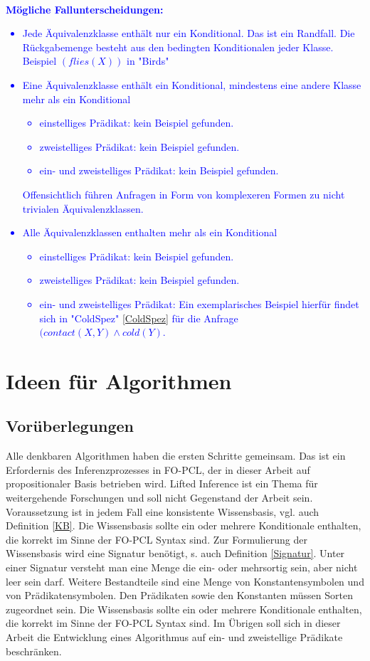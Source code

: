 \documentclass[a4paper, 11pt]{book}
\begin{document}
\textcolor{blue}{
	\\
\textbf{Mögliche Fallunterscheidungen:}\label{Fallunterscheidung Formel MehrAequi}
	\begin{itemize}
		\item Jede Äquivalenzklasse enthält nur ein Konditional. Das ist ein Randfall. Die Rückgabemenge besteht aus den bedingten Konditionalen jeder Klasse. Beispiel $ (flies(X)) $ in "{}Birds"{}  
		\item Eine Äquivalenzklasse enthält ein Konditional, mindestens eine andere Klasse mehr als ein Konditional
		\begin{itemize}
			\item einstelliges Prädikat: kein Beispiel gefunden.
			\item zweistelliges Prädikat: kein Beispiel gefunden.
			\item ein- und zweistelliges Prädikat: kein Beispiel gefunden.
		\end{itemize}
		Offensichtlich führen Anfragen in Form von komplexeren Formen zu nicht trivialen Äquivalenzklassen. 
		\item Alle Äquivalenzklassen enthalten mehr als ein Konditional
			\begin{itemize}
			\item einstelliges Prädikat: kein Beispiel gefunden.
				\item zweistelliges Prädikat: kein Beispiel gefunden.
			\item ein- und zweistelliges Prädikat: Ein exemplarisches Beispiel hierfür findet sich in "{}ColdSpez"{} \ref{ColdSpez} für die Anfrage  $ (contact(X,Y) \land cold(Y) $.
		\end{itemize}
	\end{itemize}
}


\chapter{Ideen für Algorithmen} \label{Ideen Alg.}
\section{Vorüberlegungen}
Alle denkbaren Algorithmen haben die ersten Schritte gemeinsam. Das ist ein Erfordernis des Inferenzprozesses in FO-PCL, der in dieser Arbeit auf propositionaler Basis betrieben wird. Lifted Inference ist ein Thema für weitergehende Forschungen und soll nicht Gegenstand der Arbeit sein. 
Voraussetzung ist in jedem Fall eine konsistente Wissensbasis, vgl. auch Definition \ref{KB}. Die Wissensbasis sollte ein oder mehrere Konditionale enthalten, die korrekt im Sinne der FO-PCL Syntax sind. Zur Formulierung der Wissensbasis wird eine Signatur benötigt, s. auch Definition  \ref{Signatur}. Unter einer Signatur versteht man eine Menge die ein- oder mehrsortig sein, aber nicht leer sein darf. Weitere Bestandteile sind eine Menge von Konstantensymbolen und von Prädikatensymbolen. Den Prädikaten sowie den Konstanten müssen Sorten zugeordnet sein. Die Wissensbasis sollte ein oder mehrere Konditionale enthalten, die korrekt im Sinne der FO-PCL Syntax sind. Im Übrigen soll sich in dieser Arbeit die Entwicklung eines Algorithmus auf ein- und zweistellige Prädikate beschränken.
\end{document}
